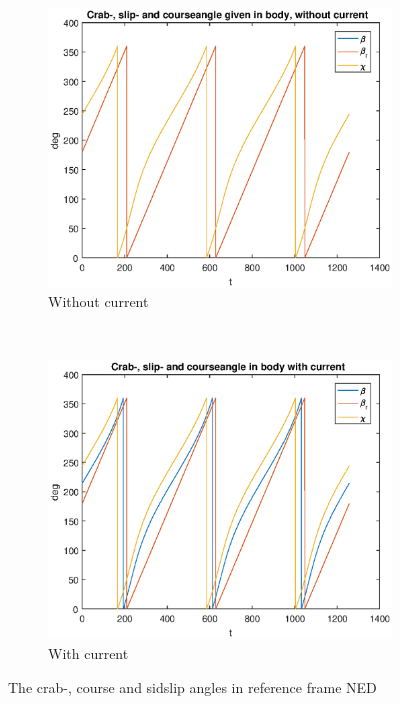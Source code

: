 \begin{figure}[!ht]
	\centering
	\begin{subfigure}[b]{0.45\textwidth}
		\includegraphics[width=\textwidth]{figures/4_crab_slip_course}
		\caption{Without current}
	\end{subfigure}
	~ %
	\begin{subfigure}[b]{0.45\textwidth}
		\includegraphics[width=\textwidth]{figures/4_crab_slip_course_current}
		\caption{With current}
	\end{subfigure}
	\label{fig:4_crab}
	\caption{The crab-, course and sidslip angles in reference frame NED}
\end{figure}

